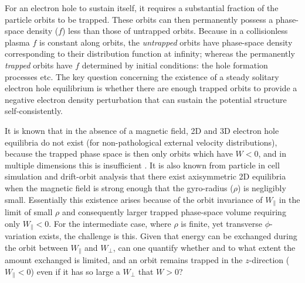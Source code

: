 \documentclass{agujournal2019}
\def\citep{\cite}
\begin{document}
For an electron hole to sustain itself, it requires a substantial
fraction of the particle orbits to be trapped. These orbits can then
permanently possess a phase-space density ($f$) less than those of
untrapped orbits. Because in a collisionless plasma $f$ is constant
along orbits, the \emph{untrapped} orbits have phase-space density
corresponding to their distribution function at infinity; whereas the
permanently \emph{trapped} orbits have $f$ determined by initial conditions:
the hole formation processes etc. The key question concerning the
existence of a steady solitary electron hole equilibrium is whether
there are enough trapped orbits to provide a negative electron density
perturbation that can sustain the potential structure
self-consistently.

It is known that in the absence of a magnetic field, 2D and 3D
electron hole equilibria do not exist (for non-pathological external
velocity distributions), because the trapped phase space is then only
orbits which have $W<0$, and in multiple dimensions this is
insufficient \citep{Krasovsky2004,Ng2005,Ng2006}. 
It is also known from particle in cell simulation and
drift-orbit analysis that there exist axisymmetric 2D equilibria when
the magnetic field is strong enough that the gyro-radius ($\rho$) is
negligibly small. Essentially this existence arises because of the
orbit invariance of $W_\parallel$ in the limit of small $\rho$ and
consequently larger trapped phase-space volume requiring only
$W_\parallel <0$.  For the intermediate case, where $\rho$ is finite,
yet transverse $\phi$-variation exists, the challenge is this. Given
that energy can be exchanged during the orbit between $W_\parallel$
and $W_\perp$, can one quantify whether and to what extent the amount
exchanged is limited, and an orbit remains trapped in the
$z$-direction ($W_\parallel<0$) even if it has so large a $W_\perp$
that $W>0$?
\end{document}
